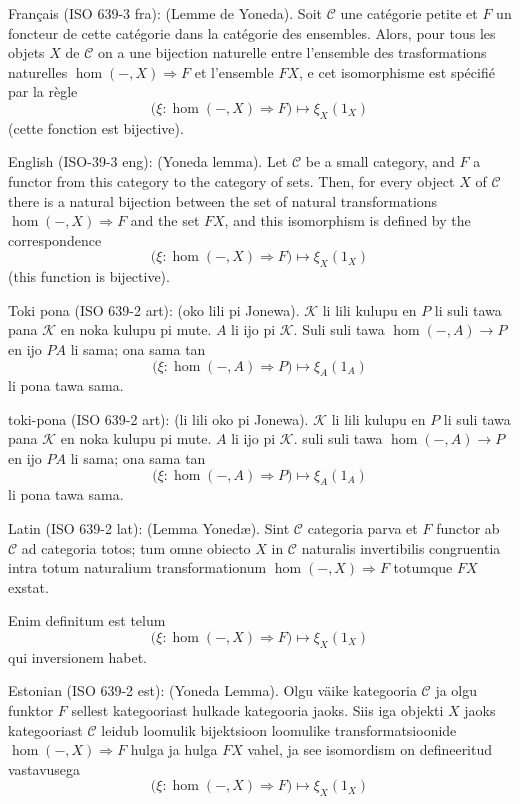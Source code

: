 \documentclass{article}
\newcommand{\tran}[3]{%
	\noindent\textsf{#1:} (#2). #3%
	\medskip\newline
}
\begin{document}
\tran{Français (ISO 639-3 fra)}{Lemme de Yoneda}{
	Soit $\mathcal C$ une catégorie petite et $F$ un foncteur de cette catégorie dans la catégorie des ensembles. Alors, pour tous les objets $X$ de $\mathcal C$ on a une bijection naturelle entre l'ensemble des trasformations naturelles $\hom(-,X)\Rightarrow F$ et l'ensemble $FX$, e cet isomorphisme est spécifié par la règle
	\[
		\Big(\xi : \hom(-,X)\Rightarrow F\Big) \mapsto \xi_X(1_X)
	\]
	(cette fonction est bijective).
}
\tran{English (ISO-39-3 eng)}{Yoneda lemma}{
Let $\mathcal C$ be a small category, and $F$ a functor from this category to the category of sets. Then, for every object $X$ of $\mathcal C$ there is a natural bijection between the set of natural transformations $\hom(-,X)\Rightarrow F$ and the set $FX$, and this isomorphism is defined by the correspondence
\[
	\Big(\xi : \hom(-,X)\Rightarrow F\Big) \mapsto \xi_X(1_X)
\]
(this function is bijective).
}
\tran{Toki pona (ISO 639-2 art)}{oko lili pi Jonewa}{$\mathcal K$ li lili kulupu en $P$ li suli tawa pana $\mathcal K$ en noka kulupu pi mute. $A$ li ijo pi $\mathcal K$. Suli suli tawa $\hom(-,A)\to P$ en ijo $PA$ li sama; ona sama tan
\[
	\Big(\xi : \hom(-,A)\Rightarrow P\Big) \mapsto \xi_A(1_A)
\]
li pona tawa sama.}
\tran{{\tp toki-pona} (ISO 639-2 art)}{{\tp li lili oko pi Jonewa}}{$\mathcal K$ {\tp li lili kulupu en} $P$ {\tp li suli tawa pana} $\mathcal K$ {\tp en noka kulupu pi mute}. $A$ {\tp li ijo pi} $\mathcal K$. {\tp suli suli tawa} $\hom(-,A)\to P$ {\tp en ijo} $PA$ {\tp li sama; ona sama tan}
\[
	\Big(\xi : \hom(-,A)\Rightarrow P\Big) \mapsto \xi_A(1_A)
\]
li pona tawa sama.}
\tran{Latin (ISO 639-2 lat)}{Lemma Yoned\ae}{
	Sint $\mathcal C$ categoria parva et $F$ functor ab $\mathcal C$ ad categoria totos; tum omne obiecto $X$ in $\mathcal C$ naturalis invertibilis congruentia intra totum naturalium transformationum $\hom(-,X)\Rightarrow F$ totumque $FX$ exstat.

	Enim definitum est telum
\[
	\Big(\xi : \hom(-,X)\Rightarrow F\Big) \mapsto \xi_X(1_X)
\]
qui inversionem habet.
}
\tran{Estonian (ISO 639-2 est)}{Yoneda Lemma}{
	Olgu väike kategooria $\mathcal C$ ja olgu funktor $F$ sellest kategooriast hulkade kategooria jaoks. Siis iga objekti $X$ jaoks kategooriast $\mathcal C$ leidub loomulik bijektsioon loomulike transformatsioonide $\hom(-,X)\Rightarrow F$ hulga ja hulga $FX$ vahel, ja see isomordism on defineeritud vastavusega
	\[
	\Big(\xi : \hom(-,X)\Rightarrow F\Big) \mapsto \xi_X(1_X)
\]
}
\end{document}
